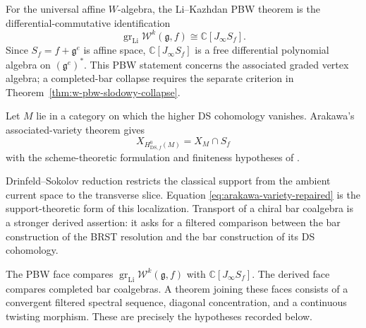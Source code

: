 \begin{remark}
\label{rem:jet-slodowy}
For the universal affine $W$-algebra, the Li--Kazhdan PBW theorem is
the differential-commutative identification
\begin{equation}\label{eq:jet-slodowy-repaired}
\operatorname{gr}_{\mathrm{Li}}\mathcal W^k(\mathfrak g,f)
\cong \mathbb C[J_\infty S_f].
\end{equation}
Since $S_f=f+\mathfrak g^e$ is affine space,
$\mathbb C[J_\infty S_f]$ is a free differential polynomial algebra
on $(\mathfrak g^e)^*$.  This PBW statement concerns the associated
graded vertex algebra; a completed-bar collapse requires the separate
criterion in Theorem~\ref{thm:w-pbw-slodowy-collapse}.
\end{remark}

\begin{theorem}
\label{thm:arakawa-variety-intersection}
Let $M$ lie in a category on which the higher DS cohomology vanishes.
Arakawa's associated-variety theorem gives
\begin{equation}\label{eq:arakawa-variety-repaired}
X_{H^0_{\mathrm{DS},f}(M)}=X_M\cap S_f
\end{equation}
with the scheme-theoretic formulation and finiteness hypotheses of
\cite{Ara15,ArakawaMoreau17}.
\end{theorem}

\begin{remark}
\label{rem:ds-geometric-localization-principle}
Drinfeld--Sokolov reduction restricts the classical support from the
ambient current space to the transverse slice.  Equation
\eqref{eq:arakawa-variety-repaired} is the support-theoretic form of
this localization.  Transport of a chiral bar coalgebra is a stronger
derived assertion: it asks for a filtered comparison between the bar
construction of the BRST resolution and the bar construction of its
DS cohomology.
\end{remark}

\begin{remark}
\label{rem:pbw-slodowy-master-square}
The PBW face compares
$\operatorname{gr}_{\mathrm{Li}}\mathcal W^k(\mathfrak g,f)$ with
$\mathbb C[J_\infty S_f]$.  The derived face compares completed bar
coalgebras.  A theorem joining these faces consists of a convergent
filtered spectral sequence, diagonal concentration, and a continuous
twisting morphism.  These are precisely the hypotheses recorded
below.
\end{remark}

